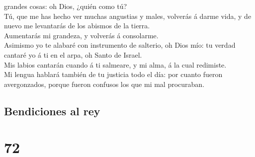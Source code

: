grandes cosas: oh Dios, ¿quién como tú?\\
 Tú, que me has hecho ver muchas angustias y males,
volverás á darme vida, y de nuevo me levantarás de los abismos de la
tierra.\\
 Aumentarás mi grandeza, y volverás á consolarme.\\
 Asimismo yo te alabaré con instrumento de salterio, oh
Dios mío: tu verdad cantaré yo á ti en el arpa, oh Santo de Israel.\\
 Mis labios cantarán cuando á ti salmeare, y mi alma, á la
cual redimiste.\\
 Mi lengua hablará también de tu justicia todo el día: por
cuanto fueron avergonzados, porque fueron confusos los que mi mal
procuraban.

\hypertarget{bendiciones-al-rey}{%
\subsection{Bendiciones al rey}\label{bendiciones-al-rey}}

\hypertarget{section-71}{%
\section{72}\label{section-71}}

